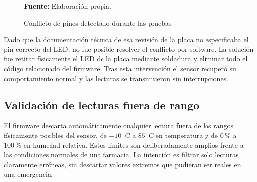 \begin{figure}[H]
{%
}
\caption{Conflicto de pines detectado durante las pruebas}
\label{fig:cap4-pin-conflicto}
\vspace{0.2cm}
\footnotesize \textbf{Fuente:} Elaboración propia.
\end{figure}

Dado que la documentación técnica de esa revisión de la placa no especificaba el pin correcto del LED, no fue posible resolver el conflicto por software. La solución fue retirar físicamente el LED de la placa mediante soldadura y eliminar todo el código relacionado del firmware. Tras esta intervención el sensor recuperó su comportamiento normal y las lecturas se transmitieron sin interrupciones.


\subsection{Validación de lecturas fuera de rango}

El firmware descarta automáticamente cualquier lectura fuera de los rangos físicamente posibles del sensor, de $-10\,^\circ\text{C}$ a $85\,^\circ\text{C}$ en temperatura y de $0\,\%$ a $100\,\%$ en humedad relativa. Estos límites son deliberadamente amplios frente a las condiciones normales de una farmacia. La intención es filtrar solo lecturas claramente erróneas, sin descartar valores extremos que pudieran ser reales en una emergencia.

